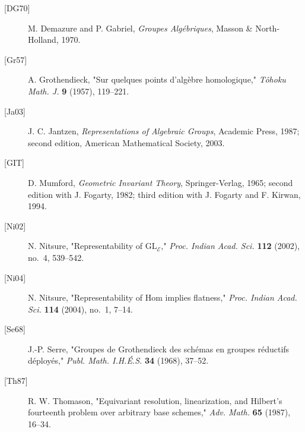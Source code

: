 \begin{description}
\item[{[DG70]}] M. Demazure and P. Gabriel,
  \emph{Groupes Alg\'ebriques}, Masson \& North-Holland, 1970.
\item[{[Gr57]}] A. Grothendieck,
  "Sur quelques points d'alg\`ebre homologique,"
  \emph{T\^ohoku Math. J.} \textbf{9} (1957), 119--221.
\item[{[Ja03]}] J. C. Jantzen,
  \emph{Representations of Algebraic Groups}, Academic Press, 1987;
  second edition, American Mathematical Society, 2003.
\item[{[GIT]}] D. Mumford,
  \emph{Geometric Invariant Theory}, Springer-Verlag, 1965;
  second edition with J. Fogarty, 1982; third edition with J. Fogarty
  and F. Kirwan, 1994.
\item[{[Ni02]}] N. Nitsure,
  "Representability of \(\mathrm{GL}_{\mathcal E}\),"
  \emph{Proc. Indian Acad. Sci.} \textbf{112} (2002), no.~4, 539--542.
\item[{[Ni04]}] N. Nitsure,
  "Representability of Hom implies flatness,"
  \emph{Proc. Indian Acad. Sci.} \textbf{114} (2004), no.~1, 7--14.
\item[{[Se68]}] J.-P. Serre,
  "Groupes de Grothendieck des sch\'emas en groupes r\'eductifs
  d\'eploy\'es,"
  \emph{Publ. Math. I.H.\'E.S.} \textbf{34} (1968), 37--52.
\item[{[Th87]}] R. W. Thomason,
  "Equivariant resolution, linearization, and Hilbert's fourteenth
  problem over arbitrary base schemes,"
  \emph{Adv. Math.} \textbf{65} (1987), 16--34.
\end{description}

